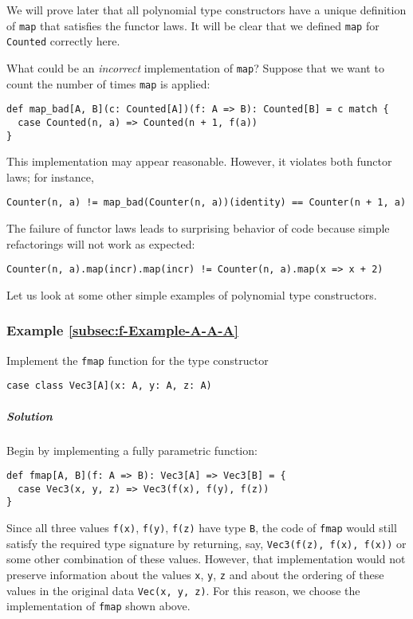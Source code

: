 We will prove later that all polynomial type constructors have a unique
definition of \lstinline!map! that satisfies the functor laws. It
will be clear that we defined \lstinline!map! for \lstinline!Counted!
correctly here. 

What could be an \emph{incorrect} implementation of \lstinline!map!?
Suppose that we want to count the number of times \lstinline!map!
is applied:
\begin{lstlisting}
def map_bad[A, B](c: Counted[A])(f: A => B): Counted[B] = c match {
  case Counted(n, a) => Counted(n + 1, f(a))
}
\end{lstlisting}
This implementation may appear reasonable. However, it violates both
functor laws; for instance,
\begin{lstlisting}
Counter(n, a) != map_bad(Counter(n, a))(identity) == Counter(n + 1, a)
\end{lstlisting}
The failure of functor laws leads to surprising behavior of code because
simple refactorings will not work as expected:
\begin{lstlisting}
Counter(n, a).map(incr).map(incr) != Counter(n, a).map(x => x + 2)
\end{lstlisting}

Let us look at some other simple examples of polynomial type constructors.

\subsubsection{Example \label{subsec:f-Example-A-A-A}\ref{subsec:f-Example-A-A-A}}

Implement the \lstinline!fmap! function for the type constructor
\begin{lstlisting}
case class Vec3[A](x: A, y: A, z: A)
\end{lstlisting}


\subparagraph{Solution}

Begin by implementing a fully parametric function:
\begin{lstlisting}
def fmap[A, B](f: A => B): Vec3[A] => Vec3[B] = {
  case Vec3(x, y, z) => Vec3(f(x), f(y), f(z))
}
\end{lstlisting}
Since all three values \lstinline!f(x)!, \lstinline!f(y)!, \lstinline!f(z)!
have type \lstinline!B!, the code of \lstinline!fmap! would still
satisfy the required type signature by returning, say, \lstinline!Vec3(f(z), f(x), f(x))!
or some other combination of these values. However, that implementation
would not preserve information about the values \lstinline!x!, \lstinline!y!,
\lstinline!z! and about the ordering of these values in the original
data \lstinline!Vec(x, y, z)!. For this reason, we choose the implementation
of \lstinline!fmap! shown above.

